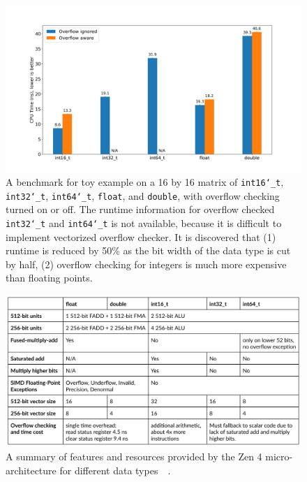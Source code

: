 \documentclass[logo,bsc,singlespacing,parskip]{infthesis}
\newcommand{\dtshort}{\texttt{int16\char`_t}}
\newcommand{\dtint}{\texttt{int32\char`_t}}
\newcommand{\dtlong}{\texttt{int64\char`_t}}
\newcommand{\dtfloat}{\texttt{float}}
\newcommand{\dtdouble}{\texttt{double}}
\begin{document}
\begin{figure}[H]\captionsetup{name=Figure}
    \begin{center}
        \includegraphics[width=\linewidth]{image/bench_datatype.png}
    \end{center}
    \caption{ A benchmark for toy example on a 16 by 16 matrix of \dtshort{},
\dtint{}, \dtlong{}, \dtfloat{}, and \dtdouble{}, with overflow checking turned
on or off. The runtime information for overflow checked \dtint{} and \dtlong{}
is not available, because it is difficult to implement vectorized overflow
checker. It is discovered that (1) runtime is
reduced by 50\% as the bit width of the data type is cut by half, (2) overflow
checking for integers is much more expensive than floating points. }
    \label{bench_datatype}
\end{figure}


\begin{figure}[H]\captionsetup{name=Figure}
    \includegraphics[width=\linewidth]{image/arch-table.png}
    \caption{A summary of features and resources provided by the Zen 4
    micro-architecture for different data
    types~\cite{Zen4Critique}~\cite{Zen2ChipWiki}.}
    \label{archtable}
\end{figure}
\end{document}

